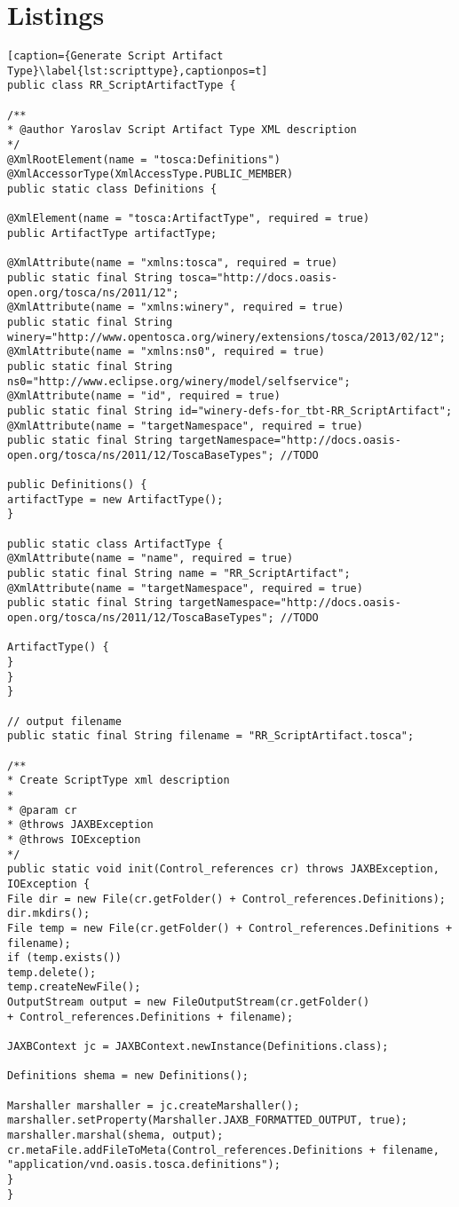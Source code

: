 
\chapter*{Listings}\label{chap:listing}
\begin{lstlisting}[caption={Generate Script Artifact Type}\label{lst:scripttype},captionpos=t] 
public class RR_ScriptArtifactType {

/**
* @author Yaroslav Script Artifact Type XML description
*/
@XmlRootElement(name = "tosca:Definitions")
@XmlAccessorType(XmlAccessType.PUBLIC_MEMBER)
public static class Definitions {

@XmlElement(name = "tosca:ArtifactType", required = true)
public ArtifactType artifactType;

@XmlAttribute(name = "xmlns:tosca", required = true)
public static final String tosca="http://docs.oasis-open.org/tosca/ns/2011/12";
@XmlAttribute(name = "xmlns:winery", required = true)
public static final String winery="http://www.opentosca.org/winery/extensions/tosca/2013/02/12";
@XmlAttribute(name = "xmlns:ns0", required = true)
public static final String ns0="http://www.eclipse.org/winery/model/selfservice";
@XmlAttribute(name = "id", required = true)
public static final String id="winery-defs-for_tbt-RR_ScriptArtifact";
@XmlAttribute(name = "targetNamespace", required = true)
public static final String targetNamespace="http://docs.oasis-open.org/tosca/ns/2011/12/ToscaBaseTypes"; //TODO

public Definitions() {
artifactType = new ArtifactType();
}

public static class ArtifactType {
@XmlAttribute(name = "name", required = true)
public static final String name = "RR_ScriptArtifact";
@XmlAttribute(name = "targetNamespace", required = true)
public static final String targetNamespace="http://docs.oasis-open.org/tosca/ns/2011/12/ToscaBaseTypes"; //TODO

ArtifactType() {
}
}
}

// output filename
public static final String filename = "RR_ScriptArtifact.tosca";

/**
* Create ScriptType xml description
* 
* @param cr
* @throws JAXBException
* @throws IOException
*/
public static void init(Control_references cr) throws JAXBException,
IOException {
File dir = new File(cr.getFolder() + Control_references.Definitions);
dir.mkdirs();
File temp = new File(cr.getFolder() + Control_references.Definitions + filename);
if (temp.exists())
temp.delete();
temp.createNewFile();
OutputStream output = new FileOutputStream(cr.getFolder()
+ Control_references.Definitions + filename);

JAXBContext jc = JAXBContext.newInstance(Definitions.class);

Definitions shema = new Definitions();

Marshaller marshaller = jc.createMarshaller();
marshaller.setProperty(Marshaller.JAXB_FORMATTED_OUTPUT, true);
marshaller.marshal(shema, output);
cr.metaFile.addFileToMeta(Control_references.Definitions + filename, "application/vnd.oasis.tosca.definitions");
}
}
\end{lstlisting}

